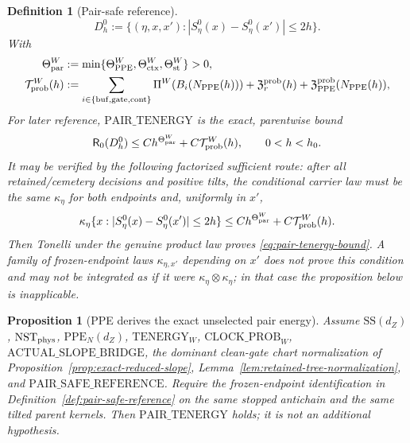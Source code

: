 \documentclass[11pt]{article}
\newtheorem{proposition}[theorem]{Proposition}
\newtheorem{definition}[theorem]{Definition}
\begin{document}
\begin{definition}[Pair-safe reference]
\begin{equation}
 D_h^0:=\{(\eta,x,x'):
     |S_\eta^0(x)-S_\eta^0(x')|\le2h\}.
\end{equation}
With
\begin{align}
 \Theta_{\rm par}^{W}&:=\min\{\Theta_{\rm PPE}^{W},
        \Theta_{\rm ctx}^{W},\Theta_{\rm st}^{W}\}>0,
 \label{eq:physical-energy-exponent}\\
 \mathcal T_{\rm prob}^{W}(h)&:=
 \sum_{i\in\{\rm buf,gate,cont\}}\Pi^W(B_i(N_{\rm PPE}(h)))
 +\mathfrak Z_r^{\rm prob}(h)
 +\mathfrak Z_{\rm PPE}^{\rm prob}(N_{\rm PPE}(h)),
 \label{eq:complete-energy-tail}
\end{align}
For later reference, $\mathrm{PAIR\_TENERGY}$ is the exact, parentwise bound
\begin{equation}
\label{eq:pair-tenergy-bound}
 \mathsf R_0(D_h^0)
 \le Ch^{\Theta_{\rm par}^{W}}+C\mathcal T_{\rm prob}^{W}(h),
 \qquad 0<h<h_0.
\end{equation}
It may be verified by the following factorized sufficient route: after all
retained/cemetery decisions and positive tilts, the conditional carrier law
must be the same $\kappa_\eta$ for both endpoints and, uniformly in
$x'$,
\begin{equation}
\label{eq:pair-tenergy-factorized-route}
 \kappa_\eta\{x:
 |S_\eta^0(x)-S_\eta^0(x')|\le2h\}
 \le Ch^{\Theta_{\rm par}^{W}}+C\mathcal T_{\rm prob}^{W}(h).
\end{equation}
Then Tonelli under the genuine product law proves
\eqref{eq:pair-tenergy-bound}.  A family of frozen-endpoint laws
$\kappa_{\eta,x'}$ depending on $x'$ does not prove this condition and may
not be integrated as if it were
$\kappa_\eta\otimes\kappa_\eta$; in that case the proposition below is
inapplicable.
\end{definition}

\begin{proposition}[PPE derives the exact unselected pair energy]
\label{prop:ppe-implies-pair-tenergy}
Assume $\mathrm{SS}(d_Z)$, $\mathrm{NST}_{\rm phys}$,
$\mathrm{PPE}_{N}(d_Z)$, $\mathrm{TENERGY}_{W}$,
$\mathrm{CLOCK\_PROB}_{W}$, $\mathrm{ACTUAL\_SLOPE\_BRIDGE}$,
the dominant clean-gate chart normalization of
Proposition~\ref{prop:exact-reduced-slope},
Lemma~\ref{lem:retained-tree-normalization}, and
$\mathrm{PAIR\_SAFE\_REFERENCE}$.  Require the frozen-endpoint
identification in Definition~\ref{def:pair-safe-reference} on the same
stopped antichain and the same tilted parent kernels.  Then
$\mathrm{PAIR\_TENERGY}$ holds; it is not an additional hypothesis.
\end{proposition}
\end{document}
